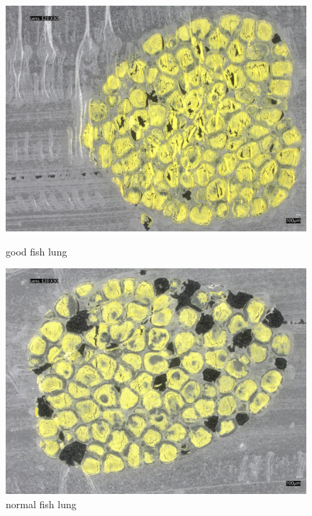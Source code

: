 \begin{figure}[H]
    \centering
    \begin{minipage}{0.45\textwidth}
        \centering
        \includegraphics[width=\textwidth]{./fig/fish_lung/good20240313_144138.jpg}
        \caption{good fish lung}
        \label{fig:good_fish_lung}
    \end{minipage}
    \begin{minipage}{0.45\textwidth}
        \centering
        \includegraphics[width=\textwidth]{./fig/fish_lung/normal20240313_141726.jpg}
        \caption{normal fish lung}
        \label{fig:noraml_fish_lung}
    \end{minipage}
\end{figure}

